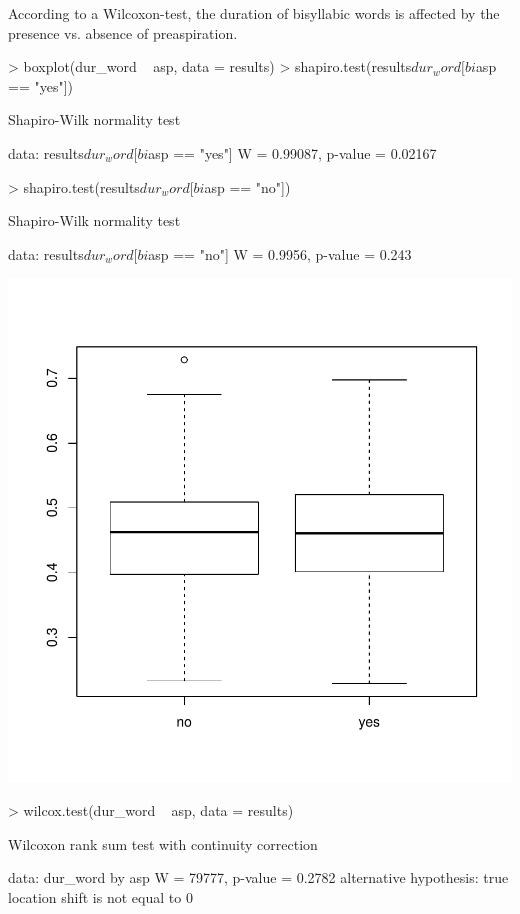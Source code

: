 \documentclass[a4paper,11pt]{article}
\begin{document}
According to a Wilcoxon-test, the duration of bisyllabic words is affected by the presence vs. absence of preaspiration.


\begin{Schunk}
\begin{Sinput}
> boxplot(dur_word ~ asp, data = results)
> shapiro.test(results$dur_word[bi$asp == "yes"])
\end{Sinput}
\begin{Soutput}
	Shapiro-Wilk normality test

data:  results$dur_word[bi$asp == "yes"]
W = 0.99087, p-value = 0.02167
\end{Soutput}
\begin{Sinput}
> shapiro.test(results$dur_word[bi$asp == "no"])
\end{Sinput}
\begin{Soutput}
	Shapiro-Wilk normality test

data:  results$dur_word[bi$asp == "no"]
W = 0.9956, p-value = 0.243
\end{Soutput}
\end{Schunk}
\includegraphics{analysis-037}

\begin{Schunk}
\begin{Sinput}
> wilcox.test(dur_word ~ asp, data = results)
\end{Sinput}
\begin{Soutput}
	Wilcoxon rank sum test with continuity correction

data:  dur_word by asp
W = 79777, p-value = 0.2782
alternative hypothesis: true location shift is not equal to 0
\end{Soutput}
\end{Schunk}
\end{document}
